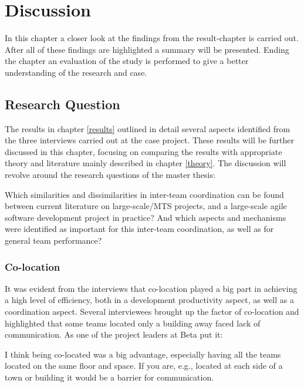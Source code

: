 \chapter{Discussion}
\label{disc}

\minitoc

In this chapter a closer look at the findings from the result-chapter is carried out. After all of these findings are highlighted a summary will be presented. Ending the chapter an evaluation of the study is performed to give a better understanding of the research and case.

\newpage

\section{Research Question}

The results in chapter \ref{results} outlined in detail several aspects identified from the three interviews carried out at the case project. These results will be further discussed in this chapter, focusing on comparing the results with appropriate theory and literature mainly described in chapter \ref{theory}. The discussion will revolve around the research questions of the master thesis:

\begin{fancyquotes}
Which similarities and dissimilarities in inter-team coordination can be found between current literature on large-scale/MTS projects, and a large-scale agile software development project in practice? And which aspects and mechanisms were identified as important for this inter-team coordination, as well as for general team performance?
\end{fancyquotes}

\subsection{Co-location}

It was evident from the interviews that co-location played a big part in achieving a high level of efficiency, both in a development productivity aspect, as well as a coordination aspect. Several interviewees brought up the factor of co-location and highlighted that some teams located only a building away faced lack of communication. As one of the project leaders at Beta put it:

\begin{fancyquotes}
I think being co-located was a big advantage, especially having all the teams located on the same floor and space. If you are, e.g., located at each side of a town or building it would be a barrier for communication.
\end{fancyquotes}

